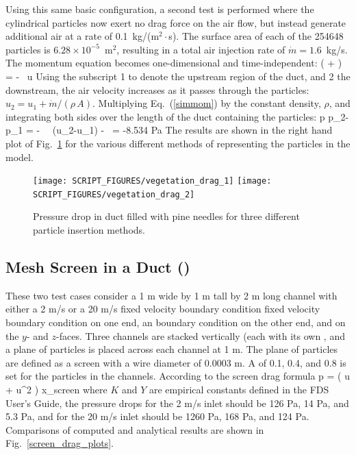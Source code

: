 \documentclass[11pt]{book}
\begin{document}
Using this same basic configuration, a second test is performed where the cylindrical particles now exert no drag force on the air flow, but instead generate additional air at a rate of 0.1~kg/(m$^2 \cdot$s). The surface area of each of the 254648 particles is $6.28 \times 10^{-5}$~m$^2$, resulting in a total air injection rate of $\dot{m}=1.6$~kg/s. The momentum equation becomes one-dimensional and time-independent:
\be
    \left(  +  \right) = -   \, u  \label{simmom}
\ee
Using the subscript 1 to denote the upstream region of the duct, and 2 the downstream, the air velocity increases as it passes through the particles: $u_2=u_1+\dot{m}/(\rho \, A)$. Multiplying Eq.~(\ref{simmom}) by the constant density, $\rho$, and integrating both sides over the length of the duct containing the particles:
\be
   \Delta p \equiv p_2-p_1 =  - \rho \,  \, (u_2-u_1) -  \,  = -8.534  \; {\rm Pa}
\ee
The results are shown in the right hand plot of Fig.~\ref{vegetation_drag_fig} for the various different methods of representing the particles in the model.

\begin{figure}[ht]
\texttt{[image: SCRIPT\_FIGURES/vegetation\_drag\_1]}
\texttt{[image: SCRIPT\_FIGURES/vegetation\_drag\_2]}
\caption[The {\ct vegetation\_drag} test cases]{Pressure drop in duct filled with pine needles for three different particle insertion methods.}
\label{vegetation_drag_fig}
\end{figure}


\subsection{Mesh Screen in a Duct (\texorpdfstring{}{screen\_drag})}
\label{screen_drag_1}
\label{screen_drag_2}

These two test cases consider a 1 m wide by 1 m tall by 2 m long channel with either a 2 m/s or a 20 m/s fixed velocity boundary condition fixed velocity boundary condition on one end, an  boundary condition on the other end, and  on the $y$- and $z$-faces.  Three channels are stacked vertically (each with its own , and a plane of particles is placed across each channel at 1 m.  The plane of particles are defined as a screen with a wire diameter of 0.0003 m.  A  of 0.1, 0.4, and 0.8 is set for the particles in the channels.  According to the screen drag formula
\be
   \Delta p \;= \; \left(  u \; + \; \rho {} u^2 \right) \Delta x_{\rm screen}
\ee
where $K$ and $Y$ are empirical constants defined in the FDS User's Guide, the pressure drops for the 2 m/s inlet should be 126 Pa, 14 Pa, and 5.3 Pa, and for the 20 m/s inlet should be 1260 Pa, 168 Pa, and 124 Pa.   Comparisons of computed and analytical results are shown in Fig.~\ref{screen_drag_plots}.
\end{document}
